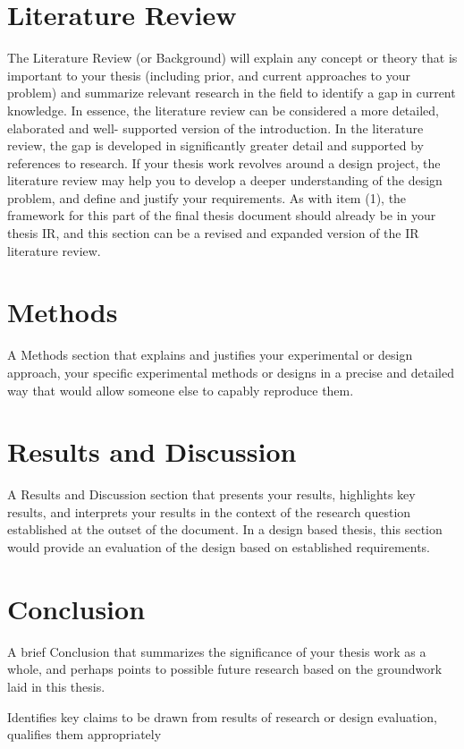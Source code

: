 \documentclass[12pt, a4paper]{article}
\begin{document}
\section{Literature Review}
The Literature Review (or Background) will explain any concept or theory that is important to your thesis (including prior, and current approaches to your problem) and summarize relevant research in the field to identify a gap in current knowledge. In essence, the literature review can be considered a more detailed, elaborated and well- supported version of the introduction. In the literature review, the gap is developed in significantly greater detail and supported by references to research. If your thesis work revolves around a design project, the literature review may help you to develop a deeper understanding of the design problem, and define and justify your requirements. As with item (1), the framework for this part of the final thesis document should already be in your thesis IR, and this section can be a revised and expanded version of the IR literature review.
\pagebreak

\section{Methods}
A Methods section that explains and justifies your experimental or design approach, your specific experimental methods or designs in a precise and detailed way that would allow someone else to capably reproduce them.
\pagebreak

\section{Results and Discussion}
A Results and Discussion section that presents your results, highlights key results, and interprets your results in the context of the research question established at the outset of the document. In a design based thesis, this section would provide an evaluation of the design based on established requirements.
\pagebreak

\section{Conclusion}
A brief Conclusion that summarizes the significance of your thesis work as a whole, and perhaps points to possible future research based on the groundwork laid in this thesis.

Identifies key claims to be drawn from results of research or design evaluation, qualifies them appropriately
       
\end{document}
